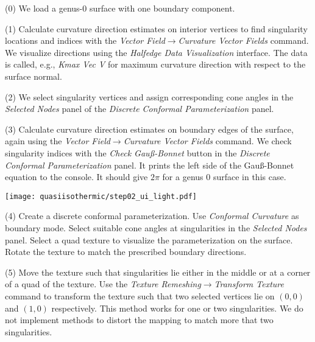\documentclass[Thesis.tex]{subfiles}
\begin{document}
\begin{compactenum}[(1)]
\item[(0)] We load a genus-$0$ surface with one boundary component.
\item[(1)] Calculate curvature direction estimates on interior vertices to find singularity locations and indices with the \emph{Vector Field$\to$Curvature Vector Fields} command. We visualize directions using the \emph{Halfedge Data Visualization} interface. The data is called, e.g., \emph{Kmax Vec V} for maximum curvature direction with respect to the surface normal.
\item[(2)] We select singularity vertices and assign corresponding cone angles in the \emph{Selected Nodes} panel of the \emph{Discrete Conformal Parameterization} panel.
\item[(3)] Calculate curvature direction estimates on boundary edges of the surface, again using the \emph{Vector Field$\to$Curvature Vector Fields} command. We check singularity indices with the \emph{Check Gau{\ss}-Bonnet} button in the \emph{Discrete Conformal Parameterization} panel. It prints the left side of the Gau{\ss}-Bonnet equation to the console. It should give $2\pi$ for a genus $0$ surface in this case.

\begin{center}
\begin{minipage}{0.7\linewidth}
            \centering
\end{minipage}
\hfill
\begin{minipage}{0.25\linewidth}
\texttt{[image: quasiisothermic/step02\_ui\_light.pdf]}
\end{minipage}
\end{center}     

\item[(4)] Create a discrete conformal parameterization. Use \emph{Conformal Curvature} as boundary mode. Select suitable cone angles at singularities in the \emph{Selected Nodes} panel. Select a quad texture to visualize the parameterization on the surface. Rotate the texture to match the prescribed boundary directions.
\item[(5)] Move the texture such that singularities lie either in the middle or at a corner of a quad of the texture. Use the \emph{Texture Remeshing$\to$Transform Texture} command to transform the texture such that two selected vertices lie on $(0,0)$ and $(1,0)$ respectively. This method works for one or two singularities. We do not implement methods to distort the mapping to match more that two singularities.


\end{compactenum}
\end{document}
